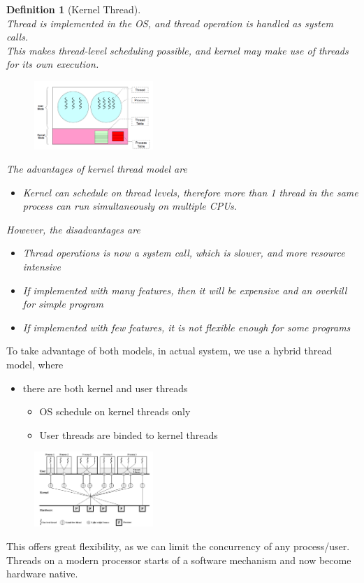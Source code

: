 \documentclass[12pt]{article}
\newtheorem{definition}{Definition}[section]
\theoremstyle{definition}
\begin{document}
\begin{definition}[Kernel Thread]
\hfill\\\normalfont Thread is implemented in the OS, and thread operation is handled as system calls.\\
This makes thread-level scheduling possible, and kernel may make use of threads for its own execution.
\begin{figure}[h]
\centering
\includegraphics[width=0.4\textwidth]{4_2.png}
\end{figure}
The advantages of kernel thread model are
\begin{itemize}
  \item Kernel can schedule on thread levels, therefore more than 1 thread in the same process can run simultaneously on multiple CPUs.
\end{itemize}
However, the disadvantages are
\begin{itemize}
  \item Thread operations is now a system call, which is slower, and more resource intensive
  \item If implemented with many features, then it will be expensive and an overkill for simple program
  \item If implemented with few features, it is not flexible enough for some programs
\end{itemize}
\end{definition}
To take advantage of both models, in actual system, we use a hybrid thread model, where
\begin{itemize}
  \item there are both kernel and user threads
  \begin{itemize}
    \item OS schedule on kernel threads only
    \item User threads are binded to kernel threads
  \end{itemize}
\end{itemize}
\begin{figure}[h]
\centering
\includegraphics[width=0.4\textwidth]{4_3.png}
\end{figure}
This offers great flexibility, as we can limit the concurrency of any process/user.\\
Threads on a modern processor starts of a software mechanism and now become hardware native.
\end{document}
